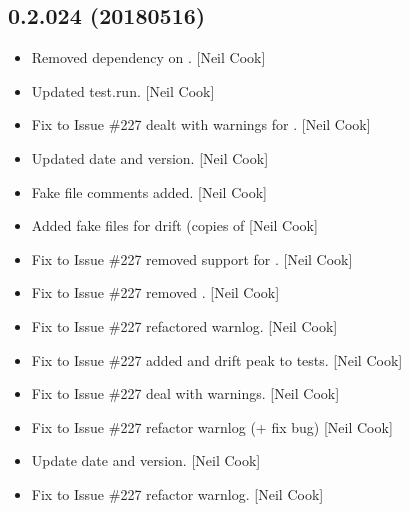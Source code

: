 \documentclass[a4paper,10pt,english]{report}
\begin{document}
\subsection{0.2.024 (2018\sphinxhyphen{}05\sphinxhyphen{}16)}
\label{\detokenize{misc/changelog:id455}}\begin{itemize}
\item {} 
Removed dependency on . {[}Neil Cook{]}

\item {} 
Updated test.run. {[}Neil Cook{]}

\item {} 
Fix to Issue \#227 \sphinxhyphen{} dealt with warnings for . {[}Neil Cook{]}

\item {} 
Updated date and version. {[}Neil Cook{]}

\item {} 
Fake file comments added. {[}Neil Cook{]}

\item {} 
Added fake  files for drift (copies of  {[}Neil Cook{]}

\item {} 
Fix to Issue \#227 \sphinxhyphen{} removed support for . {[}Neil
Cook{]}

\item {} 
Fix to Issue \#227 \sphinxhyphen{} removed . {[}Neil Cook{]}

\item {} 
Fix to Issue \#227 \sphinxhyphen{} refactored warnlog. {[}Neil Cook{]}

\item {} 
Fix to Issue \#227 \sphinxhyphen{} added  and drift peak to tests. {[}Neil
Cook{]}

\item {} 
Fix to Issue \#227 \sphinxhyphen{} deal with warnings. {[}Neil Cook{]}

\item {} 
Fix to Issue \#227 \sphinxhyphen{} refactor warnlog (+ fix bug) {[}Neil Cook{]}

\item {} 
Update date and version. {[}Neil Cook{]}

\item {} 
Fix to Issue \#227 \sphinxhyphen{} refactor warnlog. {[}Neil Cook{]}


\end{itemize}
\end{document}
